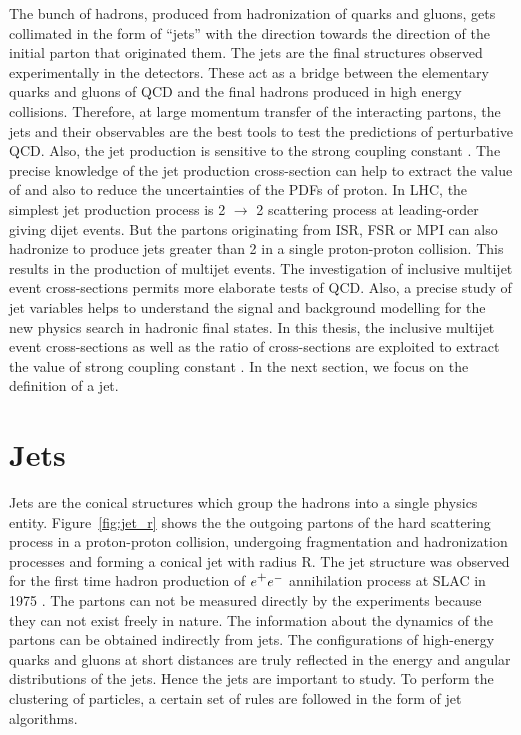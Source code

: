 The bunch of hadrons, produced from hadronization of quarks and gluons, gets collimated in the form of ``jets'' with the direction towards the direction of the initial parton that originated them. The jets are the final structures observed experimentally in the detectors. These act as a bridge between the elementary quarks and gluons of QCD and the final hadrons produced in high energy collisions. Therefore, at large momentum transfer of the interacting partons, the jets and their observables are the best tools to test the predictions of perturbative QCD. Also, the jet production is sensitive to the strong coupling constant \alpsns. The precise knowledge of the jet production cross-section can help to extract the value of \alps and also to reduce the uncertainties of the PDFs of proton. In LHC, the simplest jet production process is 2 $\rightarrow$ 2 scattering process at leading-order giving dijet events. But the partons originating from ISR, FSR or MPI can also hadronize to produce jets greater than 2 in a single proton-proton collision. This results in the production of multijet events. The investigation of inclusive multijet event cross-sections permits more elaborate tests of QCD. Also, a precise study of jet variables helps to understand the signal and background modelling for the new physics search in hadronic final states. In this thesis, the inclusive multijet event cross-sections as well as the ratio of cross-sections are exploited to extract the value of strong coupling constant \alps. In the next section, we focus on the definition of a jet.
\section{Jets}
\label{sec:jets}
Jets \cite{Sterman:1977wj} are the conical structures which group the hadrons into a single physics entity. Figure~\ref{fig:jet_r} shows the the outgoing partons of the hard scattering process in a proton-proton collision, undergoing fragmentation and hadronization processes and forming a conical jet with radius R. The jet structure was observed for the first time hadron production of $e^\plusn e^-$ annihilation process at SLAC in 1975 \cite{Hanson:1975fe}. The partons can not be measured directly by the experiments because they can not exist freely in nature. The information about the dynamics of the partons can be obtained indirectly from jets. The configurations of high-energy quarks and gluons at short distances are truly reflected in the energy and angular distributions of the jets. Hence the jets are important to study. To perform the clustering of particles, a certain set of rules are followed in the form of jet algorithms. 

